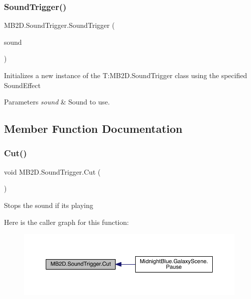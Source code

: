 \subsubsection{\texorpdfstring{Sound\+Trigger()}{SoundTrigger()}}
{\footnotesize\ttfamily M\+B2\+D.\+Sound\+Trigger.\+Sound\+Trigger (\begin{DoxyParamCaption}\item[{Sound\+Effect}]{sound }\end{DoxyParamCaption})\hspace{0.3cm}{\ttfamily [inline]}}



Initializes a new instance of the T\+:\+M\+B2\+D.\+Sound\+Trigger class using the specified Sound\+Effect 


\begin{DoxyParams}{Parameters}
{\em sound} & Sound to use.\\
\hline
\end{DoxyParams}


\subsection{Member Function Documentation}
\hypertarget{class_m_b2_d_1_1_sound_trigger_ae8846b39ac8469f479f8d64cbec25a11}{}\label{class_m_b2_d_1_1_sound_trigger_ae8846b39ac8469f479f8d64cbec25a11} 
\subsubsection{\texorpdfstring{Cut()}{Cut()}}
{\footnotesize\ttfamily void M\+B2\+D.\+Sound\+Trigger.\+Cut (\begin{DoxyParamCaption}{ }\end{DoxyParamCaption})\hspace{0.3cm}{\ttfamily [inline]}}



Stops the sound if it\textquotesingle{}s playing 

Here is the caller graph for this function\+:
\nopagebreak
\begin{figure}[H]
\begin{center}
\leavevmode
\includegraphics[width=350pt]{class_m_b2_d_1_1_sound_trigger_ae8846b39ac8469f479f8d64cbec25a11_icgraph}
\end{center}
\end{figure}
\hypertarget{class_m_b2_d_1_1_sound_trigger_aca40e191ef7b6cd594d43bb36ae787e9}{}\label{class_m_b2_d_1_1_sound_trigger_aca40e191ef7b6cd594d43bb36ae787e9} 

